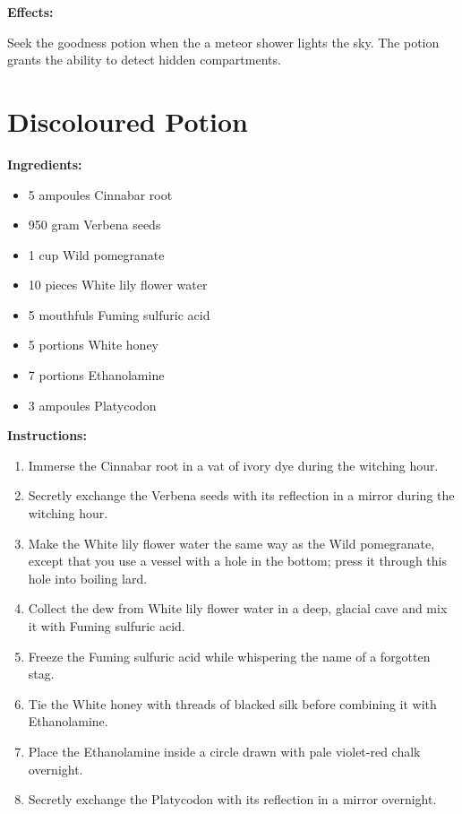 \documentclass{article}
\begin{document}
\textbf{Effects:}

Seek the goodness potion when the a meteor shower lights the sky. The potion grants the ability to detect hidden compartments.

\newpage
\section*{Discoloured Potion}

\textbf{Ingredients:}

\begin{itemize}
  \item 5 ampoules Cinnabar root
  \item 950 gram Verbena seeds
  \item 1 cup Wild pomegranate
  \item 10 pieces White lily flower water
  \item 5 mouthfuls Fuming sulfuric acid
  \item 5 portions White honey
  \item 7 portions Ethanolamine
  \item 3 ampoules Platycodon
\end{itemize}

\textbf{Instructions:}

\begin{enumerate}
  \item Immerse the Cinnabar root in a vat of ivory dye during the witching hour.
  \item Secretly exchange the Verbena seeds with its reflection in a mirror during the witching hour.
  \item Make the White lily flower water the same way as the Wild pomegranate, except that you use a vessel with a hole in the bottom; press it through this hole into boiling lard.
  \item Collect the dew from White lily flower water in a deep, glacial cave and mix it with Fuming sulfuric acid.
  \item Freeze the Fuming sulfuric acid while whispering the name of a forgotten stag.
  \item Tie the White honey with threads of blacked silk before combining it with Ethanolamine.
  \item Place the Ethanolamine inside a circle drawn with pale violet-red chalk overnight.
  \item Secretly exchange the Platycodon with its reflection in a mirror overnight.
\end{enumerate}
\end{document}
